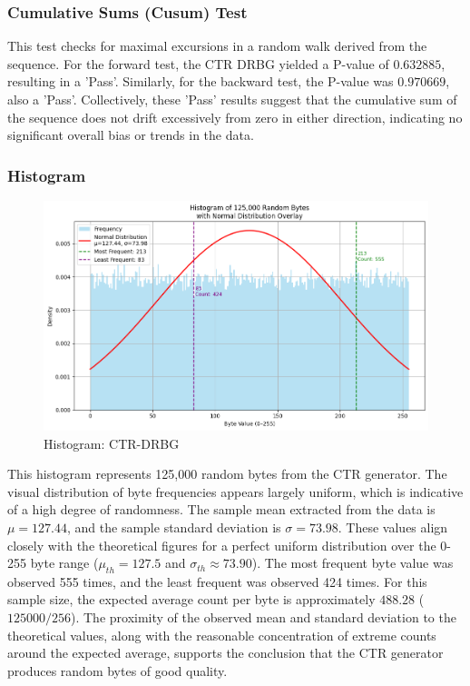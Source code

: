 \subsubsection{\textbf{Cumulative Sums (Cusum) Test}}
This test checks for maximal excursions in a random walk derived from the sequence. For the forward test, the CTR DRBG yielded a P-value of $0.632885$, resulting in a 'Pass'. Similarly, for the backward test, the P-value was $0.970669$, also a 'Pass'. Collectively, these 'Pass' results suggest that the cumulative sum of the sequence does not drift excessively from zero in either direction, indicating no significant overall bias or trends in the data.

\subsubsection{\textbf{Histogram}}


\begin{figure}[htbp] 
    \centering 
    \includegraphics[width=0.9\columnwidth]{images/Hist_CTR.png} 
    \caption{Histogram: CTR-DRBG}
    \label{fig:H:QRNG}
\end{figure}

This histogram represents 125,000 random bytes from the CTR generator. The visual distribution of byte frequencies appears largely uniform, which is indicative of a high degree of randomness. The sample mean extracted from the data is $\mu = 127.44$, and the sample standard deviation is $\sigma = 73.98$. These values align closely with the theoretical figures for a perfect uniform distribution over the 0-255 byte range ($\mu_{th} = 127.5$ and $\sigma_{th} \approx 73.90$). The most frequent byte value was observed 555 times, and the least frequent was observed 424 times. For this sample size, the expected average count per byte is approximately $488.28$ ($125000 / 256$). The proximity of the observed mean and standard deviation to the theoretical values, along with the reasonable concentration of extreme counts around the expected average, supports the conclusion that the CTR generator produces random bytes of good quality.

